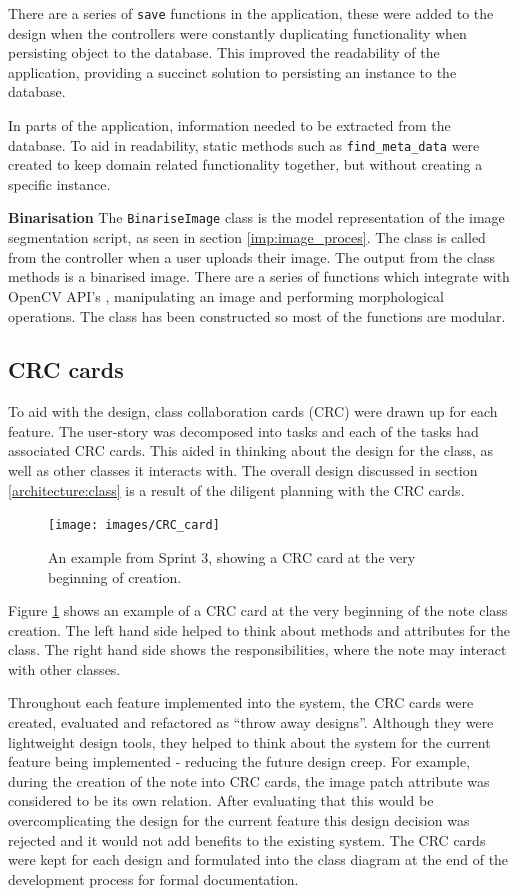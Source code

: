 There are a series of \texttt{save} functions in the application, these were added to the design when the controllers were constantly duplicating functionality when persisting object to the database. This improved the readability of the application, providing a succinct solution to persisting an instance to the database.

In parts of the application, information needed to be extracted from the database. To aid in readability, static methods such as \texttt{find\_meta\_data} were created to keep domain related functionality together, but without creating a specific instance.

\noindent
\textbf{Binarisation}
\newline
The \texttt{BinariseImage} class is the model representation of the image segmentation script, as seen in section \ref{imp:image_proces}. The class is called from the controller when a user uploads their image. The output from the class methods is a binarised image. There are a series of functions which integrate with OpenCV API's \cite{citeulike:13206865}, manipulating an image and performing morphological operations. The class has been constructed so most of the functions are modular.

\subsection{CRC cards} \label{design:CRC}
To aid with the design, class collaboration cards (CRC) were drawn up for each feature. The user-story was decomposed into tasks and each of the tasks had associated CRC cards. This aided in thinking about the design for the class, as well as other classes it interacts with.  The overall design discussed in section \ref{architecture:class} is a result of the diligent planning with the CRC cards.

\begin{figure}[H]
  \centering
  \texttt{[image: images/CRC\_card]}
  \caption{An example from Sprint 3, showing a CRC card at the very beginning of creation.}
  \label{fig:crc1}
\end{figure}

Figure \ref{fig:crc1} shows an example of a CRC card at the very beginning of the note class creation. The left hand side helped to think about methods and attributes for the class. The right hand side shows the responsibilities, where the note may interact with other classes.

Throughout each feature implemented into the system, the CRC cards were created, evaluated and refactored as ``throw away designs''. Although they were lightweight design tools, they helped to think about the system for the current feature being implemented - reducing the future design creep. For example, during the creation of the note into CRC cards, the image patch attribute was considered to be its own relation. After evaluating that this would be overcomplicating the design for the current feature this design decision was rejected and it would not add benefits to the existing system. The CRC cards were kept for each design and formulated into the class diagram at the end of the development process for formal documentation.

